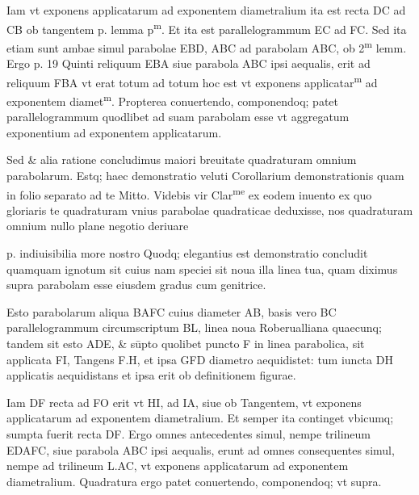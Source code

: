 \documentclass[11pt,a4paper]{article}
\begin{document}
Iam vt exponens applicatarum ad exponentem diametralium ita est recta DC ad CB ob tangentem p. lemma p\textsuperscript{m}. Et ita est parallelogrammum EC ad FC. Sed ita etiam sunt ambae simul parabolae EBD, ABC ad parabolam ABC, ob 2\textsuperscript{m} lemm. Ergo p. 19 Quinti reliquum EBA siue parabola ABC ipsi aequalis, erit ad reliquum FBA vt erat totum ad totum hoc est vt exponens applicatar\textsuperscript{m} ad exponentem diamet\textsuperscript{m}. Propterea conuertendo, componendoq; patet parallelogrammum quodlibet ad suam parabolam esse vt aggregatum exponentium ad exponentem applicatarum.

Sed \& alia ratione concludimus maiori breuitate quadraturam omnium parabolarum. Estq; haec demonstratio veluti Corollarium demonstrationis quam in folio separato ad te Mitto. Videbis vir Clar\textsuperscript{me} ex eodem inuento ex quo gloriaris te quadraturam vnius parabolae quadraticae deduxisse, nos quadraturam omnium nullo plane negotio deriuare


p. indiuisibilia more nostro Quodq; elegantius est demonstratio concludit quamquam ignotum sit cuius nam speciei sit noua illa linea tua, quam diximus supra parabolam esse eiusdem gradus cum genitrice.

Esto parabolarum aliqua BAFC cuius diameter AB, basis vero BC parallelogrammum circumscriptum BL, linea noua Roberualliana quaecunq; tandem sit esto ADE, \& sūpto quolibet puncto F in linea parabolica, sit applicata FI, Tangens F.H, et ipsa GFD diametro aequidistet: tum iuncta DH applicatis aequidistans et ipsa erit ob definitionem figurae.

Iam DF recta ad FO erit vt HI, ad IA, siue ob Tangentem, vt exponens applicatarum ad exponentem diametralium. Et semper ita continget vbicumq; sumpta fuerit recta DF. Ergo omnes antecedentes simul, nempe trilineum EDAFC, siue parabola ABC ipsi aequalis, erunt ad omnes consequentes simul, nempe ad trilineum L.AC, vt exponens applicatarum ad exponentem diametralium. Quadratura ergo patet conuertendo, componendoq; vt supra.
\end{document}
